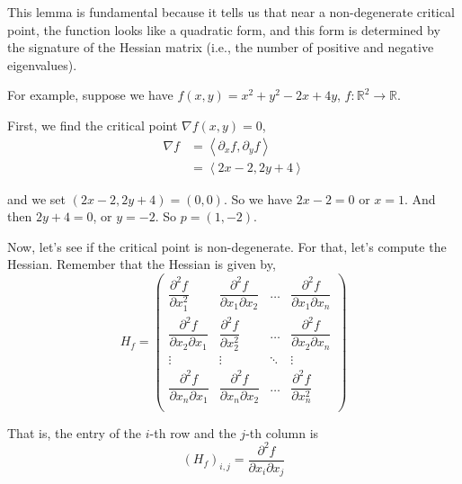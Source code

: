 This lemma is fundamental because it tells us that near a non-degenerate critical point, the function looks
like a quadratic form, and this form is determined by the signature of the Hessian matrix
(i.e., the number of positive and negative eigenvalues).

For example, suppose we have $f(x,y) = x^2 + y^2 - 2x + 4y$, $f : \mathbb{R}^2 \rightarrow \mathbb{R}$.

First, we find the critical point $\nabla f(x,y) = 0$,
\begin{align*}
\nabla f &= \left< \partial_x f, \partial_y f \right> \\
&= \left< 2x -2, 2y + 4 \right>
\end{align*}

and we set $\left( 2x -2, 2y + 4 \right) = \left( 0, 0 \right)$.
So we have $2x - 2 = 0$ or $x = 1$.
And then $2y + 4 = 0$, or $y = -2$.
So $p = (1, -2)$.

Now, let's see if the critical point is non-degenerate.
For that, let's compute the Hessian.
Remember that the Hessian is given by,
$$
H_f
=
\begin{pmatrix} 
    \dfrac{\partial^2 f}{\partial x_{1}^{2}}         & \dfrac{\partial^2 f}{\partial x_1 \partial x_2} & \dots  & \dfrac{\partial^2 f}{\partial x_1 \partial x_n}  \\[2.2ex]
    \dfrac{\partial^2 f}{\partial x_2 \partial x_1}  & \dfrac{\partial^2 f}{\partial x_{2}^{2}}        & \dots  & \dfrac{\partial^2 f}{\partial x_2 \partial x_n}  \\[2.2ex]
    \vdots                                           & \vdots                                          & \ddots & \vdots                                           \\[2.2ex]
    \dfrac{\partial^2 f}{\partial x_n \partial x_1}  & \dfrac{\partial^2 f}{\partial x_n \partial x_2} & \dots  & \dfrac{\partial^2 f}{\partial x_{n}^{2}}         \\
\end{pmatrix}
$$

That is, the entry of the $i$-th row and the $j$-th column is
$$
\left(H_f\right)_{i,j} = \frac{\partial^2 f}{\partial x_i \partial x_j}
$$

